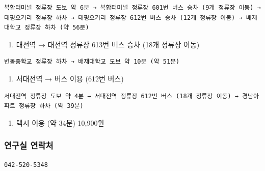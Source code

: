 \documentclass[
]{article}
\providecommand{\tightlist}{%
  \setlength{\itemsep}{0pt}\setlength{\parskip}{0pt}}
\begin{document}
\begin{verbatim}
복합터미널 정류장 도보 약 6분 → 복합터미널 정류장 601번 버스 승차 (9개 정류장 이동) → 태평오거리 정류장 하차 → 태평오거리 정류장 612번 버스 승차 (12개 정류장 이동) → 배재대학교 정류장 하차 (약 56분)
\end{verbatim}

\begin{enumerate}
\def\labelenumi{\arabic{enumi})}
\setcounter{enumi}{5}
\tightlist
\item
  대전역 → 대전역 정류장 613번 버스 승차 (18개 정류장 이동)
\end{enumerate}

\begin{verbatim}
변동중학교 정류장 하차 → 배재대학교 도보 약 10분 (약 51분)
\end{verbatim}

\begin{enumerate}
\def\labelenumi{\arabic{enumi})}
\setcounter{enumi}{6}
\tightlist
\item
  서대전역 → 버스 이용 (612번 버스)
\end{enumerate}

\begin{verbatim}
서대전역 정류장 도보 약 4분 → 서대전역 정류장 612번 버스 (18개 정류장 이동) → 경남아파트 정류장 하차 (약 39분)
\end{verbatim}

\begin{enumerate}
\def\labelenumi{\arabic{enumi})}
\setcounter{enumi}{7}
\tightlist
\item
  택시 이용 (약 34분) 10,900원
\end{enumerate}

\hypertarget{uxc5f0uxad6cuxc2e4-uxc5f0uxb77duxcc98}{%
\subsubsection{연구실
연락처}\label{uxc5f0uxad6cuxc2e4-uxc5f0uxb77duxcc98}}

\begin{verbatim}
042-520-5348 
\end{verbatim}
\end{document}
